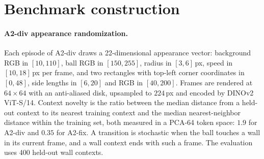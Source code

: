 \section{Benchmark construction}
\label{app:bench}
\begin{table}[h]
\caption{Benchmarks. ``Contexts repeat'' means the same context appears in the training data with several outcomes, which removes the possibility of memorizing the realized outcome.}
\label{tab:bench}
\begin{center}
\footnotesize
\setlength{\tabcolsep}{4pt}
\end{center}
\end{table}

\paragraph{A2-div appearance randomization.}
Each episode of A2-div draws a 22-dimensional appearance vector: background RGB in $[10, 110]$, ball RGB in $[150, 255]$, radius in $[3, 6]$\,px, speed in $[10, 18]$\,px per frame, and two rectangles with top-left corner coordinates in $[0, 48]$, side lengths in $[6, 20]$ and RGB in $[40, 200]$. Frames are rendered at $64\times64$ with an anti-aliased disk, upsampled to $224$\,px and encoded by DINOv2 ViT-S/14. Context novelty is the ratio between the median distance from a held-out context to its nearest training context and the median nearest-neighbor distance within the training set, both measured in a PCA-64 token space: $1.9$ for A2-div and $0.35$ for A2-fix. A transition is stochastic when the ball touches a wall in its current frame, and a wall context ends with such a frame. The evaluation uses 400 held-out wall contexts.

